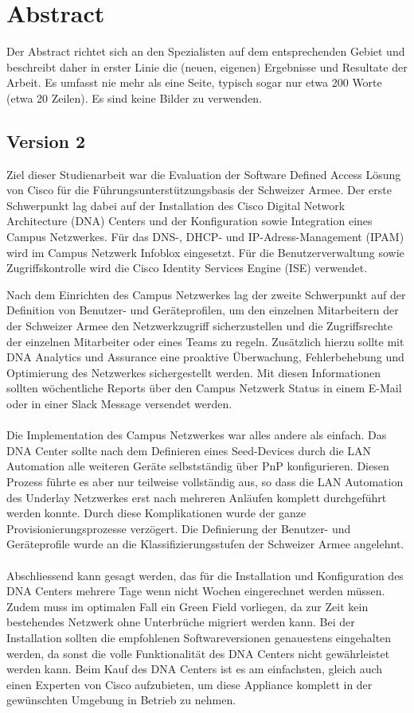 \section{Abstract}
Der Abstract richtet sich an den Spezialisten auf dem entsprechenden Gebiet und 
beschreibt daher in erster Linie die (neuen, eigenen) Ergebnisse und Resultate der 
Arbeit. Es umfasst nie mehr als eine Seite, typisch sogar nur etwa 200 Worte (etwa 
20 Zeilen). Es sind keine Bilder zu verwenden.

\subsection{Version 2}

Ziel dieser Studienarbeit war die Evaluation der Software Defined Access Lösung von Cisco für die Führungsunterstützungsbasis der Schweizer Armee. Der erste Schwerpunkt lag dabei auf der Installation des Cisco Digital Network Architecture (DNA) Centers und der Konfiguration sowie Integration eines Campus Netzwerkes. Für das DNS-, DHCP- und IP-Adress-Management (IPAM) wird im Campus Netzwerk Infoblox eingesetzt. Für die Benutzerverwaltung sowie Zugriffskontrolle wird die Cisco Identity Services Engine (ISE) verwendet.

Nach dem Einrichten des Campus Netzwerkes lag der zweite Schwerpunkt auf der Definition von Benutzer- und Geräteprofilen, um den einzelnen Mitarbeitern der der Schweizer Armee den Netzwerkzugriff sicherzustellen und die Zugriffsrechte der einzelnen Mitarbeiter oder eines Teams zu regeln. Zusätzlich hierzu sollte mit DNA Analytics und Assurance eine proaktive Überwachung, Fehlerbehebung und Optimierung des Netzwerkes sichergestellt werden. Mit diesen Informationen sollten wöchentliche Reports über den Campus Netzwerk Status in einem E-Mail oder in einer Slack Message versendet werden.\\
\\
Die Implementation des Campus Netzwerkes war alles andere als einfach. Das DNA Center sollte nach dem Definieren eines Seed-Devices durch die LAN Automation alle weiteren Geräte selbstständig über PnP konfigurieren. Diesen Prozess führte es aber nur teilweise vollständig aus, so dass die LAN Automation des Underlay Netzwerkes erst nach mehreren Anläufen komplett durchgeführt werden konnte. Durch diese Komplikationen wurde der ganze Provisionierungsprozesse verzögert. Die Definierung der Benutzer- und Geräteprofile wurde an die Klassifizierungsstufen der Schweizer Armee angelehnt.\\
\\
Abschliessend kann gesagt werden, das für die Installation und Konfiguration des DNA Centers mehrere Tage wenn nicht Wochen eingerechnet werden müssen. Zudem muss im optimalen Fall ein Green Field vorliegen, da zur Zeit kein bestehendes Netzwerk ohne Unterbrüche migriert werden kann. Bei der Installation sollten die empfohlenen Softwareversionen genauestens eingehalten werden, da sonst die volle Funktionalität des DNA Centers nicht gewährleistet werden kann. Beim Kauf des DNA Centers ist es am einfachsten, gleich auch einen Experten von Cisco aufzubieten, um diese Appliance komplett in der gewünschten Umgebung in Betrieb zu nehmen. 

